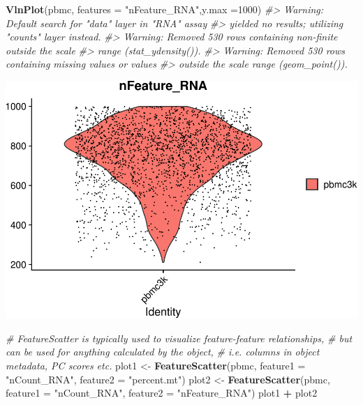 \documentclass[
]{book}
\newenvironment{Shaded}{\begin{snugshade}}{\end{snugshade}}
\newcommand{\AttributeTok}[1]{\textcolor[rgb]{0.13,0.29,0.53}{#1}}
\newcommand{\CommentTok}[1]{\textcolor[rgb]{0.56,0.35,0.01}{\textit{#1}}}
\newcommand{\DecValTok}[1]{\textcolor[rgb]{0.00,0.00,0.81}{#1}}
\newcommand{\FunctionTok}[1]{\textcolor[rgb]{0.13,0.29,0.53}{\textbf{#1}}}
\newcommand{\NormalTok}[1]{#1}
\newcommand{\OtherTok}[1]{\textcolor[rgb]{0.56,0.35,0.01}{#1}}
\newcommand{\SpecialCharTok}[1]{\textcolor[rgb]{0.81,0.36,0.00}{\textbf{#1}}}
\newcommand{\StringTok}[1]{\textcolor[rgb]{0.31,0.60,0.02}{#1}}
\begin{document}
\begin{Shaded}
\begin{Highlighting}[]
\FunctionTok{VlnPlot}\NormalTok{(pbmc, }\AttributeTok{features =} \StringTok{"nFeature\_RNA"}\NormalTok{,}\AttributeTok{y.max =}\DecValTok{1000}\NormalTok{)}
\CommentTok{\#\textgreater{} Warning: Default search for "data" layer in "RNA" assay}
\CommentTok{\#\textgreater{} yielded no results; utilizing "counts" layer instead.}
\CommentTok{\#\textgreater{} Warning: Removed 530 rows containing non{-}finite outside the scale}
\CommentTok{\#\textgreater{} range (\textasciigrave{}stat\_ydensity()\textasciigrave{}).}
\CommentTok{\#\textgreater{} Warning: Removed 530 rows containing missing values or values}
\CommentTok{\#\textgreater{} outside the scale range (\textasciigrave{}geom\_point()\textasciigrave{}).}
\end{Highlighting}
\end{Shaded}

\includegraphics{scRNAseqInR_Doco_files/figure-latex/qc2-3.pdf}

\begin{Shaded}
\begin{Highlighting}[]


\CommentTok{\# FeatureScatter is typically used to visualize feature{-}feature relationships, }
\CommentTok{\# but can be used for anything calculated by the object, }
\CommentTok{\# i.e. columns in object metadata, PC scores etc.}
\NormalTok{plot1 }\OtherTok{\textless{}{-}} \FunctionTok{FeatureScatter}\NormalTok{(pbmc, }\AttributeTok{feature1 =} \StringTok{"nCount\_RNA"}\NormalTok{, }\AttributeTok{feature2 =} \StringTok{"percent.mt"}\NormalTok{) }
\NormalTok{plot2 }\OtherTok{\textless{}{-}} \FunctionTok{FeatureScatter}\NormalTok{(pbmc, }\AttributeTok{feature1 =} \StringTok{"nCount\_RNA"}\NormalTok{, }\AttributeTok{feature2 =} \StringTok{"nFeature\_RNA"}\NormalTok{) }
\NormalTok{plot1 }\SpecialCharTok{+}\NormalTok{ plot2}
\end{Highlighting}
\end{Shaded}
\end{document}
